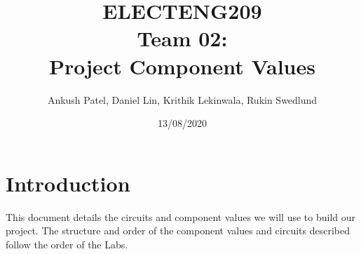 \documentclass[a4paper,12pt]{article}
\title{ELECTENG209 \\ Team 02:\\ Project Component Values}
\author{Ankush Patel, Daniel Lin, Krithik Lekinwala, Rukin Swedlund}
\date{13/08/2020}
\begin{document}
\maketitle
\newpage

\tableofcontents
\newpage

\section{Introduction}
This document details the circuits and component values we will use to build our project.
The structure and order of the component values and circuits described follow the order of the Labs.

\newpage
\end{document}
